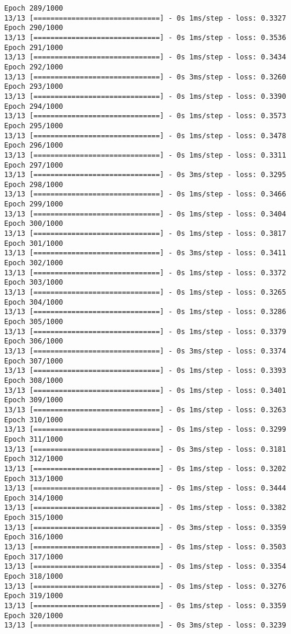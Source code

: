 \documentclass[11pt]{article}
\begin{document}
\begin{Verbatim}[commandchars=\\\{\}]
Epoch 289/1000
13/13 [==============================] - 0s 1ms/step - loss: 0.3327
Epoch 290/1000
13/13 [==============================] - 0s 1ms/step - loss: 0.3536
Epoch 291/1000
13/13 [==============================] - 0s 1ms/step - loss: 0.3434
Epoch 292/1000
13/13 [==============================] - 0s 3ms/step - loss: 0.3260
Epoch 293/1000
13/13 [==============================] - 0s 1ms/step - loss: 0.3390
Epoch 294/1000
13/13 [==============================] - 0s 1ms/step - loss: 0.3573
Epoch 295/1000
13/13 [==============================] - 0s 1ms/step - loss: 0.3478
Epoch 296/1000
13/13 [==============================] - 0s 1ms/step - loss: 0.3311
Epoch 297/1000
13/13 [==============================] - 0s 3ms/step - loss: 0.3295
Epoch 298/1000
13/13 [==============================] - 0s 1ms/step - loss: 0.3466
Epoch 299/1000
13/13 [==============================] - 0s 1ms/step - loss: 0.3404
Epoch 300/1000
13/13 [==============================] - 0s 1ms/step - loss: 0.3817
Epoch 301/1000
13/13 [==============================] - 0s 3ms/step - loss: 0.3411
Epoch 302/1000
13/13 [==============================] - 0s 1ms/step - loss: 0.3372
Epoch 303/1000
13/13 [==============================] - 0s 1ms/step - loss: 0.3265
Epoch 304/1000
13/13 [==============================] - 0s 1ms/step - loss: 0.3286
Epoch 305/1000
13/13 [==============================] - 0s 1ms/step - loss: 0.3379
Epoch 306/1000
13/13 [==============================] - 0s 3ms/step - loss: 0.3374
Epoch 307/1000
13/13 [==============================] - 0s 1ms/step - loss: 0.3393
Epoch 308/1000
13/13 [==============================] - 0s 1ms/step - loss: 0.3401
Epoch 309/1000
13/13 [==============================] - 0s 1ms/step - loss: 0.3263
Epoch 310/1000
13/13 [==============================] - 0s 1ms/step - loss: 0.3299
Epoch 311/1000
13/13 [==============================] - 0s 3ms/step - loss: 0.3181
Epoch 312/1000
13/13 [==============================] - 0s 1ms/step - loss: 0.3202
Epoch 313/1000
13/13 [==============================] - 0s 1ms/step - loss: 0.3444
Epoch 314/1000
13/13 [==============================] - 0s 1ms/step - loss: 0.3382
Epoch 315/1000
13/13 [==============================] - 0s 3ms/step - loss: 0.3359
Epoch 316/1000
13/13 [==============================] - 0s 1ms/step - loss: 0.3503
Epoch 317/1000
13/13 [==============================] - 0s 1ms/step - loss: 0.3354
Epoch 318/1000
13/13 [==============================] - 0s 1ms/step - loss: 0.3276
Epoch 319/1000
13/13 [==============================] - 0s 1ms/step - loss: 0.3359
Epoch 320/1000
13/13 [==============================] - 0s 3ms/step - loss: 0.3239

\end{Verbatim}
\end{document}
